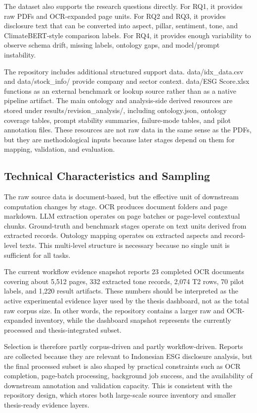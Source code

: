 The dataset also supports the research questions directly. For RQ1, it provides raw PDFs and OCR-expanded page units. For RQ2 and RQ3, it provides disclosure text that can be converted into aspect, pillar, sentiment, tone, and ClimateBERT-style comparison labels. For RQ4, it provides enough variability to observe schema drift, missing labels, ontology gaps, and model/prompt instability.

The repository includes additional structured support data. data/idx\_data.csv and data/stock\_info/ provide company and sector context. data/ESG Score.xlsx functions as an external benchmark or lookup source rather than as a native pipeline artifact. The main ontology and analysis-side derived resources are stored under results/revision\_analysis/, including ontology.json, ontology coverage tables, prompt stability summaries, failure-mode tables, and pilot annotation files. These resources are not raw data in the same sense as the PDFs, but they are methodological inputs because later stages depend on them for mapping, validation, and evaluation.

\subsection{Technical Characteristics and Sampling}

The raw source data is document-based, but the effective unit of downstream computation changes by stage. OCR produces document folders and page markdown. LLM extraction operates on page batches or page-level contextual chunks. Ground-truth and benchmark stages operate on text units derived from extracted records. Ontology mapping operates on extracted aspects and record-level texts. This multi-level structure is necessary because no single unit is sufficient for all tasks.

The current workflow evidence snapshot  reports 23 completed OCR documents covering about 5,512 pages, 332 extracted tone records, 2,074 T2 rows, 70 pilot labels, and 1,220 result artifacts. These numbers should be interpreted as the active experimental evidence layer used by the thesis dashboard, not as the total raw corpus size. In other words, the repository contains a larger raw and OCR-expanded inventory, while the dashboard snapshot represents the currently processed and thesis-integrated subset.

Selection is therefore partly corpus-driven and partly workflow-driven. Reports are collected because they are relevant to Indonesian ESG disclosure analysis, but the final processed subset is also shaped by practical constraints such as OCR completion, page-batch processing, background job success, and the availability of downstream annotation and validation capacity. This is consistent with the repository design, which stores both large-scale source inventory and smaller thesis-ready evidence layers.

